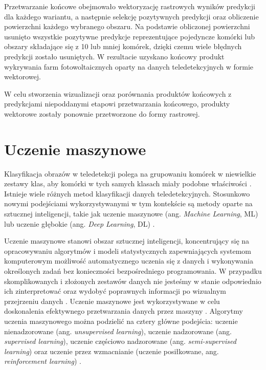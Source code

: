 \documentclass{amuthesis}
\begin{document}
Przetwarzanie końcowe obejmowało wektoryzację rastrowych wyników
predykcji dla każdego wariantu, a następnie selekcję pozytywnych
predykcji oraz obliczenie powierzchni każdego wybranego obszaru. Na
podstawie obliczonej powierzchni usunięto wszystkie pozytywne predykcje
reprezentujące pojedyncze komórki lub obszary składające się z 10 lub
mniej komórek, dzięki czemu wiele błędnych predykcji zostało usuniętych.
W rezultacie uzyskano końcowy produkt wykrywania farm fotowoltaicznych
oparty na danych teledetekcyjnych w formie wektorowej.

W celu stworzenia wizualizacji oraz porównania produktów końcowych z
predykcjami niepoddanymi etapowi przetwarzania końcowego, produkty
wektorowe zostały ponownie przetworzone do formy rastrowej.

\hypertarget{sec-machine-learning}{%
\section{Uczenie maszynowe}\label{sec-machine-learning}}

Klasyfikacja obrazów w teledetekcji polega na grupowaniu komórek w
niewielkie zestawy klas, aby komórki w tych samych klasach miały podobne
właściwości \autocite{ismail_2009_classification}. Istnieje wiele
różnych metod klasyfikacji danych teledetekcyjnych. Stosunkowo nowymi
podejściami wykorzystywanymi w tym kontekście są metody oparte na
sztucznej inteligencji, takie jak uczenie maszynowe (ang. \emph{Machine
Learning}, ML) lub uczenie głębokie (ang. \emph{Deep Learning}, DL)
\autocite{hejmanowska_2020_dane}.

Uczenie maszynowe stanowi obszar sztucznej inteligencji, koncentrujący
się na opracowywaniu algorytmów i modeli statystycznych zapewniających
systemom komputerowym możliwość automatycznego uczenia się z danych i
wykonywania określonych zadań bez konieczności bezpośredniego
programowania. W przypadku skomplikowanych i złożonych zestawów danych
nie jesteśmy w stanie odpowiednio ich zinterpretować oraz wydobyć
poprawnych informacji po wizualnym przejrzeniu danych
\autocite{mahesh_2019_ml}. Uczenie maszynowe jest wykorzystywane w celu
doskonalenia efektywnego przetwarzania danych przez maszyny
\autocite{sindayigaya_2022_ml}. Algorytmy uczenia maszynowego można
podzielić na cztery główne podejścia: uczenie nienadzorowane (ang.
\emph{unsupervised learning}), uczenie nadzorowane (ang.
\emph{supervised learning}), uczenie częściowo nadzorowane (ang.
\emph{semi-supervised learning}) oraz uczenie przez wzmacnianie (uczenie
posiłkowane, ang. \emph{reinforcement learning})
\autocite{sarker_2021_ml}.
\end{document}
